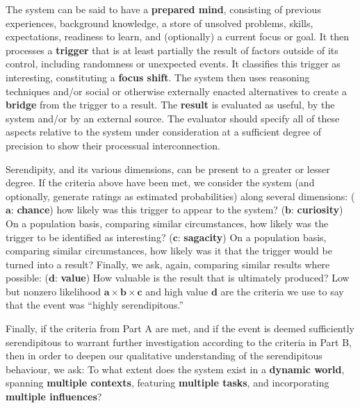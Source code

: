 
\begin{description}[itemsep=16pt]
\item[{(\textbf{A - Definitional characteristics})}] {The system can
  be said to have a {\textbf{prepared mind}}, consisting of previous
  experiences, background knowledge, a store of unsolved problems,
  skills, expectations, readiness to learn, and (optionally) a current
  focus or goal.  It then processes a {\textbf{trigger}} that is at
  least partially the result of factors outside of its control,
  including randomness or unexpected events.  It classifies this
  trigger as interesting, constituting a {\textbf{focus shift}}.  The
  system then uses reasoning techniques and/or social or otherwise
  externally enacted alternatives to create a {\textbf{bridge}} from
  the trigger to a result.  The {\textbf{result}} is evaluated as
  useful, by the system and/or by an external source.}  The evaluator
  should specify all of these aspects relative to the system under
  consideration at a sufficient degree of precision to show their
  processual interconnection.
\item[{(\textbf{B - Dimensions})}] {Serendipity, and its various
  dimensions, can be present to a greater or lesser degree.  If the
  criteria above have been met, we consider the system (and
  optionally, generate ratings as estimated probabilities) along
  several dimensions:
%
{($\mathbf{a}$: \textbf{chance})} how likely was this trigger to appear to
  the system?
%
{($\mathbf{b}$: \textbf{curiosity})} On a population basis, comparing
similar circumstances, how likely was the trigger to be identified as
interesting?
%
{($\mathbf{c}$: \textbf{sagacity})} On a population basis, comparing
similar circumstances, how likely was it that the trigger would be
turned into a result?
%
Finally, we ask, again, comparing similar results where possible:
{($\mathbf{d}$: \textbf{value})} How valuable is the result that
is ultimately produced?}
%
{Low but nonzero likelihood $\mathbf{a}\times\mathbf{b}\times\mathbf{c}$ 
 and high value $\mathbf{d}$ are the criteria we use to say that the event was ``highly serendipitous.''}
\item[{(\textbf{C - Factors})}] {Finally, if the criteria from Part A
  are met, and if the event is deemed sufficiently serendipitous to
  warrant further investigation according to the criteria in Part B,
  then in order to deepen our qualitative understanding of the
  serendipitous behaviour, we ask: To what extent does the system
  exist in a {\textbf{dynamic world}}, spanning {\textbf{multiple
      contexts}}, featuring {\textbf{multiple tasks}}, and
  incorporating {\textbf{multiple influences}}?}
\end{description}

